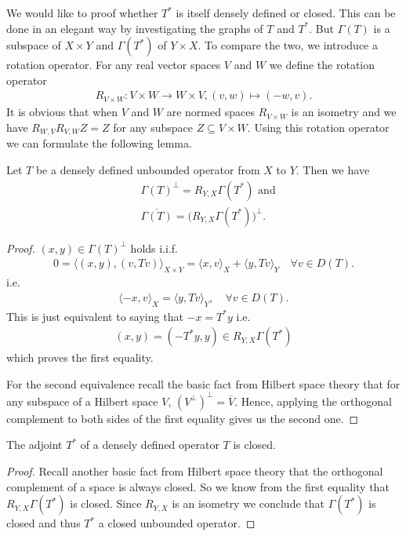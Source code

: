\documentclass[../main.tex]{subfiles}
\begin{document}
We would like to proof whether $T^*$ is itself densely defined or closed. 
This can be done in an elegant way by investigating the graphs of $T$ and 
$T^*$. But $\Gamma(T)$ is a subspace of $X\times Y$ and 
$\Gamma(T^*)$ of $Y\times X$. To compare the two, we introduce a rotation operator. 
For any real vector spaces $V$ and $W$ we define the rotation operator 
\begin{align*}
    R_{V\times W}: V\times W \rightarrow W \times V, (v,w) \mapsto (-w,v).
\end{align*}
It is obvious that when $V$ and $W$ are normed spaces $R_{V\times W}$ is an isometry 
and we have $R_{W,V}R_{V,W}Z = Z$ for any subspace $Z\subseteq V\times W$.
Using this rotation operator we can formulate the following lemma.
\begin{lemma}\label{lem:rotated_graph}
    Let $T$ be a densely defined unbounded operator from $X$ to $Y$. 
    Then we have 
    \begin{align*}
        & \Gamma(T)^\perp = R_{Y,X}\Gamma(T^*) \text{ and}
        \\ &\overline{\Gamma(T)} = \big(R_{Y,X}\Gamma(T^*)\big)^\perp.
    \end{align*}
\end{lemma}
\begin{proof}
    $(x,y) \in \Gamma(T)^\perp$ holds i.i.f. 
    \begin{align*}
        0 = \langle (x,y), (v,Tv) \rangle _{X\times Y}
        = \langle x, v \rangle _X + \langle y, Tv \rangle _Y
            \quad \forall v \in D(T).
    \end{align*}
    i.e. 
    \begin{align*}
        \langle -x, v \rangle _X = \langle y, Tv \rangle _Y,
            \quad \forall v \in D(T).
    \end{align*}
    This is just equivalent to saying that $-x = T^*y$ i.e.
    \begin{align*}
        (x,y) = (-T^*y,y) \in R_{Y,X}\Gamma(T^*)
    \end{align*}
    which proves the first equality.

    For the second equivalence recall the basic fact from Hilbert space theory
    that for any subspace of a Hilbert space $V$,
    $(V^\perp)^\perp = \overline{V}$. Hence, applying the orthogonal 
    complement to both sides of the first equality gives us the second one.
\end{proof}

\begin{corollary}\label{cor:adjoint_of_densely_defined}
    The adjoint $T^*$ of a densely defined operator $T$ is closed. 
\end{corollary}
\begin{proof}
    Recall another basic fact from Hilbert space theory that the 
    orthogonal complement of a space is always closed. 
    So we know from the first equality that $R_{Y,X}\Gamma(T^*)$ is closed.
    Since $R_{Y,X}$ is an isometry we conclude that $\Gamma(T^*)$ is closed and 
    thus $T^*$ a closed unbounded operator.
\end{proof}
\end{document}
